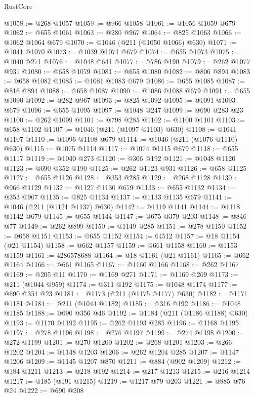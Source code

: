 \begin{lexlean}{RustCore}
\begin{coremodule}
@1058 := @268 @1057
@1059 := @966 @1058
@1061 := @1056 @1059 @679
@1062 := @655 @1061
@1063 := @280 @967
@1064 := @825 @1063
@1066 := @1062 @1064 @679
@1070 := @1046 (@211 (@1050 @1066) @630)
@1071 := @1041 @1070
@1073 := @1039 @1071 @679
@1074 := @655 @1073
@1075 := @1040 @271
@1076 := @1048 @641
@1077 := @786 @190
@1079 := @262 @1077 @931
@1080 := @658 @1079
@1081 := @655 @1080
@1082 := @806 @894
@1083 := @658 @1082
@1085 := @1081 @1083 @679
@1086 := @655 @1085
@1087 := @816 @894
@1088 := @658 @1087
@1090 := @1086 @1088 @679
@1091 := @655 @1090
@1092 := @282 @967
@1093 := @825 @1092
@1095 := @1091 @1093 @679
@1096 := @655 @1095
@1097 := @1048 @247
@1099 := @690 @283 @23
@1100 := @262 @1099
@1101 := @798 @285
@1102 := @1100 @1101
@1103 := @658 @1102
@1107 := @1046 (@211 (@1097 @1103) @630)
@1108 := @1041 @1107
@1110 := @1096 @1108 @679
@1114 := @1046 (@211 (@1076 @1110) @630)
@1115 := @1075 @1114
@1117 := @1074 @1115 @679
@1118 := @655 @1117
@1119 := @1040 @273
@1120 := @306 @192
@1121 := @1048 @1120
@1123 := @690 @352 @190
@1125 := @262 @1123 @931
@1126 := @658 @1125
@1127 := @655 @1126
@1128 := @353 @285
@1129 := @268 @1128
@1130 := @966 @1129
@1132 := @1127 @1130 @679
@1133 := @655 @1132
@1134 := @353 @967
@1135 := @825 @1134
@1137 := @1133 @1135 @679
@1141 := @1046 (@211 (@1121 @1137) @630)
@1142 := @1119 @1141
@1144 := @1118 @1142 @679
@1145 := @655 @1144
@1147 := @675 @379 @203
@1148 := @846 @77
@1149 := @262 @899
@1150 := @1149 @285
@1151 := @278 @1150
@1152 := @658 @1151
@1153 := @655 @1152
@1154 := 64512
@1157 := @18 @1154 (@21 @1154)
@1158 := @662 @1157
@1159 := @661 @1158
@1160 := @1153 @1159
@1161 := 4286578688
@1164 := @18 @1161 (@21 @1161)
@1165 := @662 @1164
@1166 := @661 @1165
@1167 := @1160 @1166
@1168 := @262 @1167
@1169 := @205 @11
@1170 := @1169 @271
@1171 := @1169 @269
@1173 := @211 (@1044 @959)
@1174 := @311 @192
@1175 := @1048 @1174
@1177 := @690 @354 @23
@1181 := @1173 (@211 (@1175 @1177) @630)
@1182 := @1171 @1181
@1184 := @211 (@1044 @1182)
@1185 := @316 @192
@1186 := @1048 @1185
@1188 := @690 @356 @46
@1192 := @1184 (@211 (@1186 @1188) @630)
@1193 := @1170 @1192
@1195 := @262 @1193 @285
@1196 := @1168 @1195
@1197 := @278 @1196
@1198 := @276 @1197
@1199 := @274 @1198
@1200 := @272 @1199
@1201 := @270 @1200
@1202 := @268 @1201
@1203 := @266 @1202
@1204 := @1148 @1203
@1206 := @262 @1204 @285
@1207 := @1147 @1206
@1209 := @1145 @1207 @870
@1211 := @884 (@902 @1209)
@1212 := @184 @1211
@1213 := @218 @192
@1214 := @217 @1213
@1215 := @216 @1214
@1217 := @185 (@191 @1215)
@1219 := @1217 @79 @203
@1221 := @885 @76 @24
@1222 := @690 @208

\end{coremodule}
\end{lexlean}

